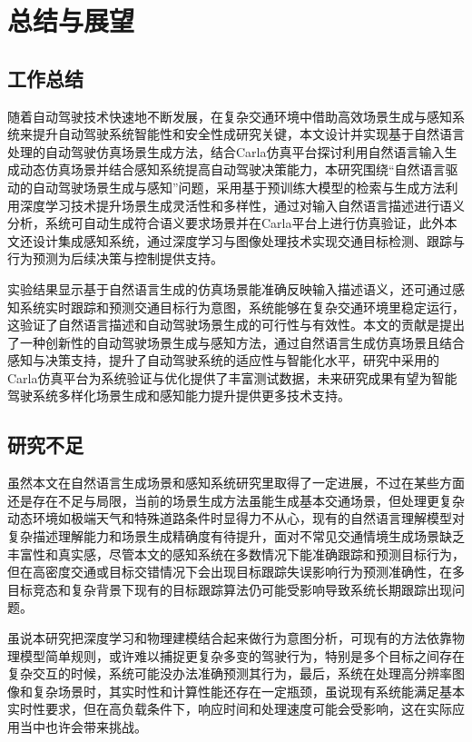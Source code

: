 \chapter{总结与展望}

\section{工作总结}

随着自动驾驶技术快速地不断发展，在复杂交通环境中借助高效场景生成与感知系统来提升自动驾驶系统智能性和安全性成研究关键，本文设计并实现基于自然语言处理的自动驾驶仿真场景生成方法，结合Carla仿真平台探讨利用自然语言输入生成动态仿真场景并结合感知系统提高自动驾驶决策能力，本研究围绕“自然语言驱动的自动驾驶场景生成与感知”问题，采用基于预训练大模型的检索与生成方法利用深度学习技术提升场景生成灵活性和多样性，通过对输入自然语言描述进行语义分析，系统可自动生成符合语义要求场景并在Carla平台上进行仿真验证，此外本文还设计集成感知系统，通过深度学习与图像处理技术实现交通目标检测、跟踪与行为预测为后续决策与控制提供支持。

实验结果显示基于自然语言生成的仿真场景能准确反映输入描述语义，还可通过感知系统实时跟踪和预测交通目标行为意图，系统能够在复杂交通环境里稳定运行，这验证了自然语言描述和自动驾驶场景生成的可行性与有效性。本文的贡献是提出了一种创新性的自动驾驶场景生成与感知方法，通过自然语言生成仿真场景且结合感知与决策支持，提升了自动驾驶系统的适应性与智能化水平，研究中采用的Carla仿真平台为系统验证与优化提供了丰富测试数据，未来研究成果有望为智能驾驶系统多样化场景生成和感知能力提升提供更多技术支持。

\section{研究不足}
虽然本文在自然语言生成场景和感知系统研究里取得了一定进展，不过在某些方面还是存在不足与局限，当前的场景生成方法虽能生成基本交通场景，但处理更复杂动态环境如极端天气和特殊道路条件时显得力不从心，现有的自然语言理解模型对复杂描述理解能力和场景生成精确度有待提升，面对不常见交通情境生成场景缺乏丰富性和真实感，尽管本文的感知系统在多数情况下能准确跟踪和预测目标行为，但在高密度交通或目标交错情况下会出现目标跟踪失误影响行为预测准确性，在多目标竞态和复杂背景下现有的目标跟踪算法仍可能受影响导致系统长期跟踪出现问题。


虽说本研究把深度学习和物理建模结合起来做行为意图分析，可现有的方法依靠物理模型简单规则，或许难以捕捉更复杂多变的驾驶行为，特别是多个目标之间存在复杂交互的时候，系统可能没办法准确预测其行为，最后，系统在处理高分辨率图像和复杂场景时，其实时性和计算性能还存在一定瓶颈，虽说现有系统能满足基本实时性要求，但在高负载条件下，响应时间和处理速度可能会受影响，这在实际应用当中也许会带来挑战。

